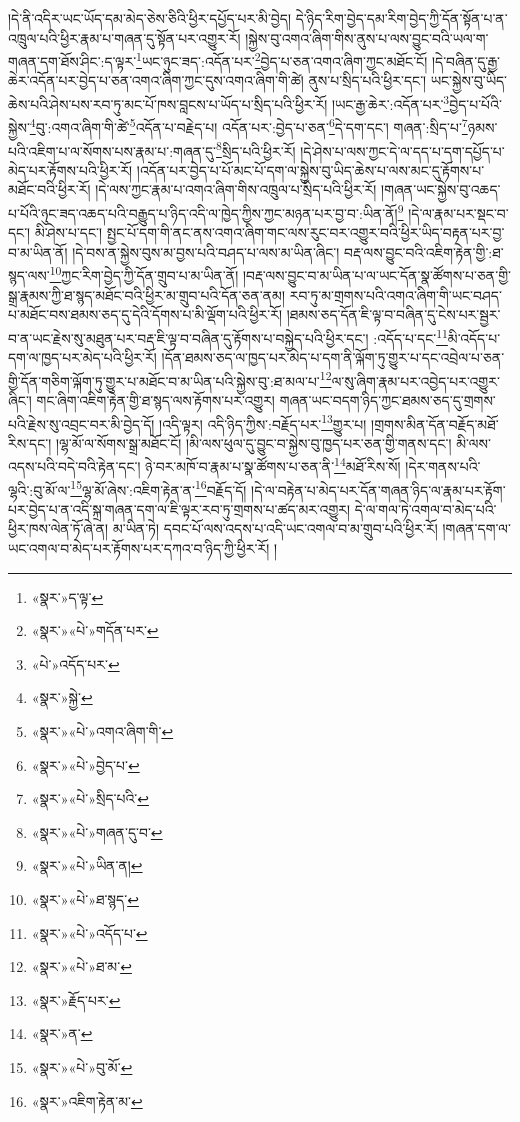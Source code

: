 །དེ་ནི་འདིར་ཡང་ཡོད་དམ་མེད་ཅེས་ཅིའི་ཕྱིར་དཔྱོད་པར་མི་བྱེད། དེ་ཉིད་རིག་བྱེད་དམ་རིག་བྱེད་ཀྱི་དོན་སྟོན་པ་ན་འཁྲུལ་པའི་ཕྱིར་རྣམ་པ་གཞན་དུ་སྟོན་པར་འགྱུར་རོ། །སྐྱེས་བུ་འགའ་ཞིག་གིས་ནུས་པ་ལས་བྱུང་བའི་ཡལ་ག་གཞན་དག་ཐོས་ཤིང་:ད་ལྟར་\footnote{«སྣར་»ད་ལྟ་}ཡང་ཉུང་ཟད་:འདོན་པར་\footnote{«སྣར་»«པེ་»གདོན་པར་}བྱེད་པ་ཅན་འགའ་ཞིག་ཀྱང་མཐོང་ངོ། །དེ་བཞིན་དུ་རྒྱ་ཆེར་འདོན་པར་བྱེད་པ་ཅན་འགའ་ཞིག་ཀྱང་དུས་འགའ་ཞིག་གི་ཚེ། ནུས་པ་སྲིད་པའི་ཕྱིར་དང་། ཡང་སྐྱེས་བུ་ཡིད་ཆེས་པའི་ཤེས་པས་རབ་ཏུ་མང་པོ་ཁས་བླངས་པ་ཡོད་པ་སྲིད་པའི་ཕྱིར་རོ། །ཡང་རྒྱ་ཆེར་:འདོན་པར་\footnote{«པེ་»འདོད་པར་}བྱེད་པ་པོའི་སྐྱེས་\footnote{«སྣར་»སྐྱེ་}བུ་:འགའ་ཞིག་གི་ཚེ་\footnote{«སྣར་»«པེ་»འགའ་ཞིག་གི་}འདོན་པ་བརྗེད་པ། འདོན་པར་:བྱེད་པ་ཅན་\footnote{«སྣར་»«པེ་»བྱེད་པ་}དེ་དག་དང་། གཞན་:སྲིད་པ་\footnote{«སྣར་»«པེ་»སྲིད་པའི་}ཉམས་པའི་འཇིག་པ་ལ་སོགས་པས་རྣམ་པ་:གཞན་དུ་\footnote{«སྣར་»«པེ་»གཞན་དུ་བ་}སྲིད་པའི་ཕྱིར་རོ། །དེ་ཤེས་པ་ལས་ཀྱང་དེ་ལ་དད་པ་དག་དཔྱོད་པ་མེད་པར་རྟོགས་པའི་ཕྱིར་རོ། །འདོན་པར་བྱེད་པ་པོ་མང་པོ་དག་ལ་སྐྱེས་བུ་ཡིད་ཆེས་པ་ལས་མང་དུ་རྟོགས་པ་མཐོང་བའི་ཕྱིར་རོ། །དེ་ལས་ཀྱང་རྣམ་པ་འགའ་ཞིག་གིས་འཁྲུལ་པ་སྲིད་པའི་ཕྱིར་རོ། །གཞན་ཡང་སྐྱེས་བུ་འཆད་པ་པོའི་ཉུང་ཟད་འཆད་པའི་བརྒྱུད་པ་ཉིད་འདི་ལ་ཁྱེད་ཀྱིས་ཀྱང་མཉན་པར་བྱ་བ་:ཡིན་ནོ།\footnote{«སྣར་»«པེ་»ཡིན་ན།} །དེ་ལ་རྣམ་པར་སྡང་བ་དང་། མི་ཤེས་པ་དང་། སྤྱང་པོ་དག་གི་ནང་ནས་འགའ་ཞིག་གང་ལས་རུང་བར་འགྱུར་བའི་ཕྱིར་ཡིད་བརྟན་པར་བྱ་བ་མ་ཡིན་ནོ། །དེ་བས་ན་སྐྱེས་བུས་མ་བྱས་པའི་བཤད་པ་ལས་མ་ཡིན་ཞིང་། བརྡ་ལས་བྱུང་བའི་འཇིག་རྟེན་གྱི་:ཐ་སྙད་ལས་\footnote{«སྣར་»«པེ་»ཐ་སྙད་}ཀྱང་རིག་བྱེད་ཀྱི་དོན་གྲུབ་པ་མ་ཡིན་ནོ། །བརྡ་ལས་བྱུང་བ་མ་ཡིན་པ་ལ་ཡང་དོན་སྣ་ཚོགས་པ་ཅན་གྱི་སྒྲ་རྣམས་ཀྱི་ཐ་སྙད་མཐོང་བའི་ཕྱིར་མ་གྲུབ་པའི་དོན་ཅན་ནམ། རབ་ཏུ་མ་གྲགས་པའི་འགའ་ཞིག་གི་ཡང་བཤད་པ་མཐོང་བས་ཐམས་ཅད་དུ་དེའི་དོགས་པ་མི་ལྡོག་པའི་ཕྱིར་རོ། །ཐམས་ཅད་དོན་ཇི་ལྟ་བ་བཞིན་དུ་ངེས་པར་སྦྱར་བ་ན་ཡང་རྗེས་སུ་མཐུན་པར་བརྡ་ཇི་ལྟ་བ་བཞིན་དུ་རྟོགས་པ་བསྐྱེད་པའི་ཕྱིར་དང་། :འདོད་པ་དང་\footnote{«སྣར་»«པེ་»འདོད་པ་}མི་འདོད་པ་དག་ལ་ཁྱད་པར་མེད་པའི་ཕྱིར་རོ། །དོན་ཐམས་ཅད་ལ་ཁྱད་པར་མེད་པ་དག་ནི་ལྐོག་ཏུ་གྱུར་པ་དང་འབྲེལ་པ་ཅན་གྱི་དོན་གཅིག་ལྐོག་ཏུ་གྱུར་པ་མཐོང་བ་མ་ཡིན་པའི་སྐྱེས་བུ་:ཐ་མལ་པ་\footnote{«སྣར་»«པེ་»ཐ་མ་}ལ་སུ་ཞིག་རྣམ་པར་འབྱེད་པར་འགྱུར་ཞིང་། གང་ཞིག་འཇིག་རྟེན་གྱི་ཐ་སྙད་ལས་རྟོགས་པར་འགྱུར། གཞན་ཡང་བདག་ཉིད་ཀྱང་ཐམས་ཅད་དུ་གྲགས་པའི་རྗེས་སུ་འབྲང་བར་མི་བྱེད་དོ། །འདི་ལྟར། འདི་ཉིད་ཀྱིས་:བརྗོད་པར་\footnote{«སྣར་»རྗོད་པར་}གྱུར་པ། །གྲགས་མིན་དོན་བརྗོད་མཐོ་རིས་དང་། །ལྷ་མོ་ལ་སོགས་སྒྲ་མཐོང་ངོ། །མི་ལས་ཕུལ་དུ་བྱུང་བ་སྐྱེས་བུ་ཁྱད་པར་ཅན་གྱི་གནས་དང་། མི་ལས་འདས་པའི་བདེ་བའི་རྟེན་དང་། ཉེ་བར་མཁོ་བ་རྣམ་པ་སྣ་ཚོགས་པ་ཅན་ནི་\footnote{«སྣར་»ན་}མཐོ་རིས་སོ། །དེར་གནས་པའི་ལྷའི་:བུ་མོ་ལ་\footnote{«སྣར་»«པེ་»བུ་མོ་}ལྷ་མོ་ཞེས་:འཇིག་རྟེན་ན་\footnote{«སྣར་»འཇིག་རྟེན་མ་}བརྗོད་དོ། །དེ་ལ་བརྟེན་པ་མེད་པར་དོན་གཞན་ཉིད་ལ་རྣམ་པར་རྟོག་པར་བྱེད་པ་ན་འདི་སྐྲ་གཞན་དག་ལ་ཇི་ལྟར་རབ་ཏུ་གྲགས་པ་ཚད་མར་འགྱུར། དེ་ལ་གལ་ཏེ་འགལ་བ་མེད་པའི་ཕྱིར་ཁས་ལེན་ཏོ་ཞེ་ན། མ་ཡིན་ཏེ། དབང་པོ་ལས་འདས་པ་འདི་ཡང་འགལ་བ་མ་གྲུབ་པའི་ཕྱིར་རོ། །གཞན་དག་ལ་ཡང་འགལ་བ་མེད་པར་རྟོགས་པར་དཀའ་བ་ཉིད་ཀྱི་ཕྱིར་རོ། །
